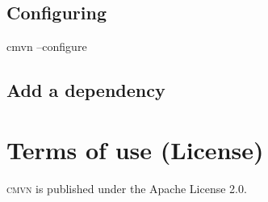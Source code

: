 \documentclass[a4paper,11pt,english,oneside,halfparskip]{scrartcl}
\newcommand{\CMVN}{\textsc{\small{}cmvn}}
\begin{document}
\subsection{Configuring} 

\begin{Cmdline}
cmvn --configure 
\end{Cmdline}


\subsection{Add a dependency}



\section{Terms of use (License)}

\CMVN{} is published under the Apache License 2.0.
\end{document}
